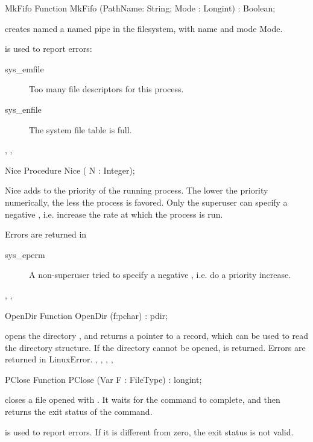 \html{}
\begin{function}{MkFifo}
\Declaration
Function MkFifo (PathName: String; Mode : Longint) : Boolean;

\Description
{} creates named a named pipe in the filesystem, with name
 and mode {Mode}. 

\Errors
  is used to report errors:
\begin{description}
\item[sys\_emfile] Too many file descriptors for this process.
\item[sys\_enfile] The system file table is full.
\end{description}

\SeeAlso
{}, , 
\end{function}
\begin{procedure}{Nice}
\Declaration
Procedure Nice ( N : Integer);

\Description
Nice adds  to the priority of the running process. The lower the
priority numerically, the less the process is favored.
Only the superuser can specify a negative , i.e. increase the rate at
which the process is run.

\Errors
 Errors are returned in 
\begin{description}
\item [sys\_eperm] A non-superuser tried to specify a negative , i.e.
do a priority increase.
\end{description}

\SeeAlso
{}, , 
\end{procedure}
\html{}
\begin{function}{OpenDir}
\Declaration
Function OpenDir (f:pchar) : pdir;

\Description
  opens the directory  , and returns a 
pointer to a  record, which can be used to read the directory 
structure. If the directory cannot be opened,  is returned.
\Errors
Errors are returned in LinuxError.
\SeeAlso
{}, , , ,
\end{function}
\html{}
\begin{function}{PClose}
\Declaration
Function PClose (Var F : FileType) : longint;

\Description
  closes a file opened with . It waits for the
command to complete, and then returns the exit status of the command. 

\Errors
{} is used to report errors. If it is different from zero,
the exit status is not valid.
\SeeAlso
{}
\end{function}
